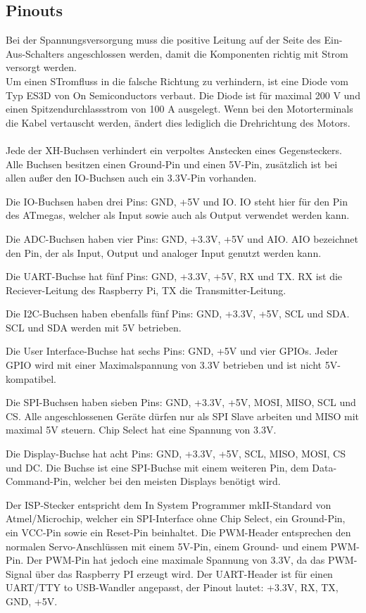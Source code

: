 \documentclass[12pt]{article}
\begin{document}
\subsection{Pinouts}
Bei der Spannungsversorgung muss die positive Leitung auf der Seite des Ein-Aus-Schalters angeschlossen werden, damit die Komponenten richtig mit Strom versorgt werden.\\
Um einen STromfluss in die falsche Richtung zu verhindern, ist eine Diode vom Typ ES3D von On Semiconductors verbaut. Die Diode ist für maximal 200 V und einen Spitzendurchlassstrom von 100 A ausgelegt. Wenn bei den Motorterminals die Kabel vertauscht werden, ändert dies lediglich die Drehrichtung des Motors.\\\\
Jede der XH-Buchsen verhindert ein verpoltes Anstecken eines Gegensteckers. Alle Buchsen besitzen einen Ground-Pin und einen 5V-Pin, zusätzlich ist bei allen außer den IO-Buchsen auch ein 3.3V-Pin vorhanden. 
\begin{compactitem}
    \item Die IO-Buchsen haben drei Pins: GND, +5V und IO. IO steht hier für den Pin des ATmegas, welcher als Input sowie auch als Output verwendet werden kann.
    \item Die ADC-Buchsen haben vier Pins: GND, +3.3V, +5V und AIO. AIO bezeichnet den Pin, der als Input, Output und analoger Input genutzt werden kann.
    \item Die UART-Buchse hat fünf Pins: GND, +3.3V, +5V, RX und TX. RX ist die Reciever-Leitung des Raspberry Pi, TX die Transmitter-Leitung.
    \item Die I2C-Buchsen haben ebenfalls fünf Pins: GND, +3.3V, +5V, SCL und SDA. SCL und SDA werden mit 5V betrieben.
    \item Die User Interface-Buchse hat sechs Pins: GND, +5V und vier GPIOs. Jeder GPIO wird mit einer Maximalspannung von 3.3V betrieben und ist nicht 5V-kompatibel.
    \item Die SPI-Buchsen haben sieben Pins: GND, +3.3V, +5V, MOSI, MISO, SCL und CS. Alle angeschlossenen Geräte dürfen nur als SPI Slave arbeiten und MISO mit maximal 5V steuern. Chip Select hat eine Spannung von 3.3V.
    \item Die Display-Buchse hat acht Pins: GND, +3.3V, +5V, SCL, MISO, MOSI, CS und DC. Die Buchse ist eine SPI-Buchse mit einem weiteren Pin, dem Data-Command-Pin, welcher bei den meisten Displays benötigt wird.
\end{compactitem}
Der ISP-Stecker entspricht dem In System Programmer mkII-Standard von Atmel/Microchip, welcher ein SPI-Interface ohne Chip Select, ein Ground-Pin, ein VCC-Pin sowie ein Reset-Pin beinhaltet. Die PWM-Header entsprechen den normalen Servo-Anschlüssen mit einem 5V-Pin, einem Ground- und einem PWM-Pin. Der PWM-Pin hat jedoch eine maximale Spannung von 3.3V, da das PWM-Signal über das Raspberry PI erzeugt wird. Der UART-Header ist für einen UART/TTY to USB-Wandler angepasst, der Pinout lautet: +3.3V, RX, TX, GND, +5V.
\end{document}
